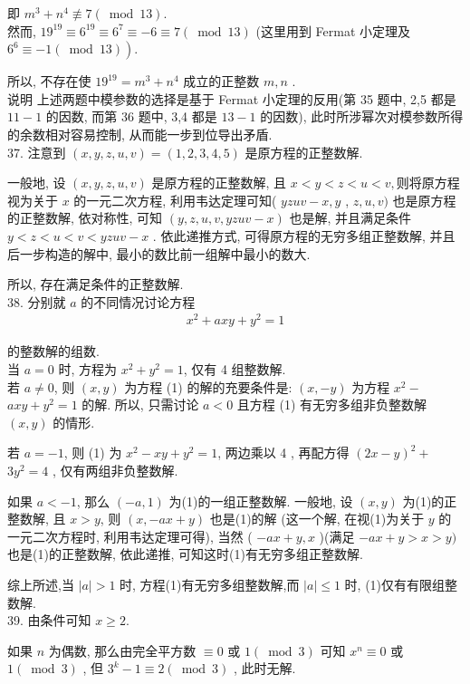 即 $m^{3}+n^{4} \not \equiv 7(\bmod 13)$.\\
然而,  $19^{19} \equiv 6^{19} \equiv 6^{7} \equiv-6 \equiv 7(\bmod 13)$ (这里用到 Fermat 小定理及 $\left.6^{6} \equiv-1(\bmod 13)\right)$.

所以, 不存在使 $19^{19}=m^{3}+n^{4}$ 成立的正整数 $m ,  n$ . \\
说明 上述两题中模参数的选择是基于 Fermat 小定理的反用(第 35 题中,  2,5 都是 $11-1$ 的因数, 而第 36 题中,  3,4 都是 $13-1$ 的因数), 此时所涉幂次对模参数所得的余数相对容易控制, 从而能一步到位导出矛盾. \\
37. 注意到 $(x, y, z, u, v)=(1,2,3,4,5)$ 是原方程的正整数解.

一般地, 设 $(x, y, z, u, v)$ 是原方程的正整数解, 且 $x<y<z<u<v , $则将原方程视为关于 $x$ 的一元二次方程, 利用韦达定理可知( $y z u v-x, y$ ,  $z, u, v)$ 也是原方程的正整数解, 依对称性, 可知 $(y, z, u, v, y z u v-x)$ 也是解, 并且满足条件 $y<z<u<v<y z u v-x$ . 依此递推方式, 可得原方程的无穷多组正整数解, 并且后一步构造的解中, 最小的数比前一组解中最小的数大.

所以, 存在满足条件的正整数解. \\
38. 分别就 $a$ 的不同情况讨论方程
\begin{align*}
	x^{2}+a x y+y^{2}=1
\end{align*}

的整数解的组数.\\
当 $a=0$ 时, 方程为 $x^{2}+y^{2}=1$, 仅有 4 组整数解.\\
若 $a \neq 0$, 则 $(x, y)$ 为方程 (1) 的解的充要条件是: $(x,-y)$ 为方程 $x^{2}-$ $a x y+y^{2}=1$ 的解. 所以, 只需讨论 $a<0$ 且方程 (1) 有无穷多组非负整数解 $(x, y)$ 的情形.

若 $a=-1$, 则 (1) 为 $x^{2}-x y+y^{2}=1$, 两边乘以 4 , 再配方得 $(2 x-y)^{2}+$ $3 y^{2}=4$ , 仅有两组非负整数解.

如果 $a<-1$, 那么 $(-a, 1)$ 为(1)的一组正整数解. 一般地, 设 $(x, y)$ 为(1)的正整数解, 且 $x>y$, 则 $(x,-a x+y)$ 也是(1)的解 (这一个解, 在视(1)为关于 $y$ 的一元二次方程时, 利用韦达定理可得), 当然 ( $-a x+y, x$ )(满足 $-a x+y>x>y)$ 也是(1)的正整数解, 依此递推, 可知这时(1)有无穷多组正整数解.

综上所述,当 $|a|>1$ 时, 方程(1)有无穷多组整数解,而 $|a| \leqslant 1$ 时, (1)仅有有限组整数解.\\
39. 由条件可知 $x \geqslant 2$.

如果 $n$ 为偶数, 那么由完全平方数 $\equiv 0$ 或 $1(\bmod 3)$ 可知 $x^{n} \equiv 0$ 或 $1(\bmod 3)$ , 但 $3^{k}-1 \equiv 2(\bmod 3)$ , 此时无解.

